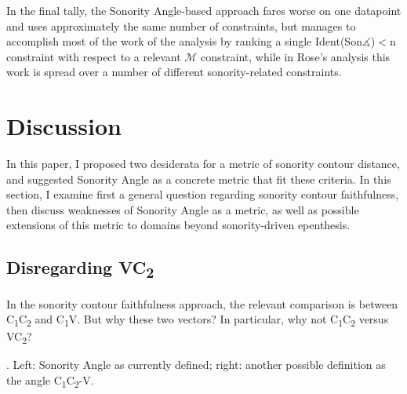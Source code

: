\documentclass[12pt]{article}
\begin{document}
In the final tally, the {\sc Sonority Angle}-based approach fares worse on one datapoint and uses approximately the same number of constraints, but manages to accomplish most of the work of the analysis by ranking a single {\sc Ident(Son$\measuredangle$)}$<$n constraint with respect to a relevant $\mathcal{M}$ constraint, while in Rose's analysis this work is spread over a number of different sonority-related constraints.

\section{Discussion} \label{issues}

In this paper, I proposed two desiderata for a metric of sonority contour distance, and suggested {\sc Sonority Angle} as a concrete metric that fit these criteria. In this section, I examine first a general question regarding sonority contour faithfulness, then discuss weaknesses of {\sc Sonority Angle} as a metric, as well as possible extensions of this metric to domains beyond sonority-driven epenthesis.


\subsection{Disregarding VC\textsubscript{2}} 

In the sonority contour faithfulness approach, the relevant comparison is between C\textsubscript{1}C\textsubscript{2} and C\textsubscript{1}V. But why these two vectors? In particular, why not C\textsubscript{1}C\textsubscript{2} versus VC\textsubscript{2}?

\ex. Left: {\sc Sonority Angle} as currently defined; right: another possible definition as the angle C\textsubscript{1}C\textsubscript{2}-V.

\vspace{-1em} \hspace{1.5in}
\bigskip
\end{document}
